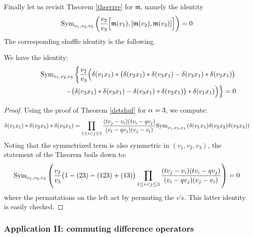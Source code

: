 Finally let us revisit Theorem \ref{thserrre} for ${\mathfrak m}$, namely the identity 
$${\rm Sym}_{v_1,v_2,v_3}\left( 
\frac{v_2}{v_3} {\Big[}{\mathfrak m}(v_1),{[}{\mathfrak m}(v_2),{\mathfrak m}(v_3){]}{\Big]}
\right)=0$$
The corresponding shuffle identity is the following.
\begin{thm}\label{shufserre}
We have the identity:
\begin{eqnarray*}
&&{\rm Sym}_{v_1,v_2,v_3}\left\{ 
\frac{v_2}{v_3}\Big(\delta(v_1x_1)*\big(\delta(v_2 x_1)*\delta(v_3x_1)-\delta(v_3 x_1)*\delta(v_2x_1)\big)\right. \\
&&\qquad\qquad\qquad \left. -
\big(\delta(v_2 x_1)*\delta(v_3x_1)-\delta(v_3 x_1)*\delta(v_2x_1)\big)*\delta(v_1x_1)\Big)\right\}=0
\end{eqnarray*}
\end{thm}
\begin{proof}
Using the proof of Theorem \ref{detshuf} for ${\alpha}=3$, we compute:
$$\delta(v_1x_1)*\delta(v_2 x_1)*\delta(v_3 x_1)=
\prod_{1\leq i<j\leq 3}\frac{(tv_j-v_i)(t v_i-q v_j)}{(v_i-q v_j)(v_j-v_i)} {\rm Sym}_{x_1,x_2,x_3}\left(
\delta(v_1x_1)\delta(v_2 x_2)\delta(v_3 x_3)\right)$$
Noting that the symmetrized term is also symmetric in $(v_1,v_2,v_3)$, the statement of the Theorem
boils down to:
$${\rm Sym}_{v_1,v_2,v_3}\left(\frac{v_2}{v_3}\big(1-(23)-(123)+(13)\big)
\prod_{1\leq i<j\leq 3}\frac{(tv_j-v_i)(t v_i-q v_j)}{(v_i-q v_j)(v_j-v_i)}\right)=0$$
where the permutations on the left act by permuting the $v$'s. This latter identity is easily checked.
\end{proof}




\subsubsection{Application II: commuting difference operators}\label{appsectwo}

